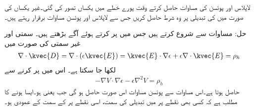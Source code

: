 لاپلاس اور پوئسن  کی مساوات حاصل کرتے وقت پورے خطے میں یکساں  تصور کی گئی۔غیر یکساں  کی صورت میں  کی تبدیلی پر وہ شرط حاصل کریں جس سے لاپلاس اور پوئسن مساوات برقرار رہتے ہیں۔

حل: مساوات  سے شروع کرتے ہیں جس میں  پر کرتے ہوئے آگے بڑھتے ہیں۔ سمتی  اور غیر سمتی  کی صورت میں
\begin{align*}
\nabla \cdot \kvec{D}=\nabla \cdot (\epsilon \kvec{E})=\kvec{E} \cdot \nabla \epsilon+\epsilon \nabla \cdot \kvec{E}=\rho_h
\end{align*}
لکھا جا سکتا ہے۔  اس میں  پر کرنے سے
\begin{align*}
-\nabla V \cdot \nabla \epsilon-\epsilon \nabla^2 V=\rho_h
\end{align*}
حاصل ہوتا ہے۔اس مساوات سے پوئسن مساوات اس صورت حاصل ہو گی جب  یعنی  ہو۔ایسا ہونے کا مطلب ہے  کہ کسی بھی نقطے پر   میں تبدیلی کی سمت، اسی نقطے پر  کے سمت کے عمودی ہو۔ 


